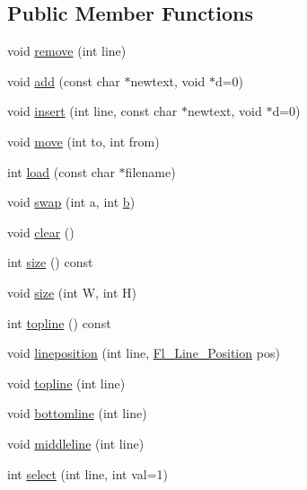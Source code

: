 \subsection*{Public Member Functions}
\begin{DoxyCompactItemize}
\item 
void \hyperlink{class_fl___browser_acd72281ddbd70f23025a9f155fe89f93}{remove} (int line)
\item 
void \hyperlink{class_fl___browser_af2761597d5618fa4d1339563ee127e29}{add} (const char $\ast$newtext, void $\ast$d=0)
\item 
void \hyperlink{class_fl___browser_a1c2d8c2a3168ec8308efb5ce3a277238}{insert} (int line, const char $\ast$newtext, void $\ast$d=0)
\item 
void \hyperlink{class_fl___browser_ae6be1ff2e44cc96d1fcd0b7693e0eff2}{move} (int to, int from)
\item 
int \hyperlink{class_fl___browser_a0d8c975bc7adf9850a3e94a189ef813a}{load} (const char $\ast$filename)
\item 
void \hyperlink{class_fl___browser_a476e8214ed6ca0d6395b588f2cb1e929}{swap} (int a, int \hyperlink{forms_8_h_a0ba06a290a384fa06b1b90745827dae2}{b})
\item 
void \hyperlink{class_fl___browser_a5dfce5f5c42d872865d39e65faba6073}{clear} ()
\item 
int \hyperlink{class_fl___browser_aa091ef8cad532a0ca99797f13d113fec}{size} () const
\item 
void \hyperlink{class_fl___browser_a7ca88d093395b54918c8a369178c7679}{size} (int W, int H)
\item 
int \hyperlink{class_fl___browser_a4064f948e0191a8d7a0a4b39aaa632cd}{topline} () const
\item 
void \hyperlink{class_fl___browser_ab1266ecc779babeef0825e935d873dff}{lineposition} (int line, \hyperlink{class_fl___browser_a1baffc4660ee0f5c8f3d86a7373b854a}{Fl\+\_\+\+Line\+\_\+\+Position} pos)
\item 
void \hyperlink{class_fl___browser_ac99e17e28e04da112b1af7fdb6193c9c}{topline} (int line)
\item 
void \hyperlink{class_fl___browser_ad74d4d85549d4563a584ab0759832f6d}{bottomline} (int line)
\item 
void \hyperlink{class_fl___browser_aeed63f2ef05839563c626c349fc40292}{middleline} (int line)
\item 
int \hyperlink{class_fl___browser_aeeb8ee901d16becf815c258505fc3ceb}{select} (int line, int val=1)
\item 

\end{DoxyCompactItemize}

